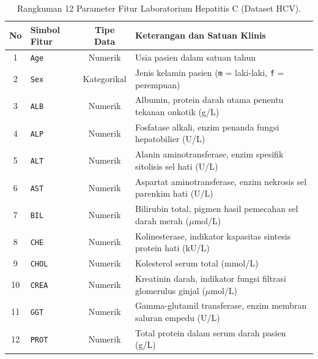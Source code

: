 \documentclass[a4paper,oneside,12pt]{report}
\begin{document}
\begin{table}[H]
\centering
\caption{Rangkuman 12 Parameter Fitur Laboratorium Hepatitis C (Dataset HCV).}
\label{tab:fitur-hcv}
\small
\begin{tabularx}{\linewidth}{|c|l|c|>{\raggedright\arraybackslash}X|}
\hline
\textbf{No} & \textbf{Simbol Fitur} & \textbf{Tipe Data} & \textbf{Keterangan dan Satuan Klinis} \\
\hline
1 & \texttt{Age} & Numerik & Usia pasien dalam satuan tahun \\
\hline
2 & \texttt{Sex} & Kategorikal & Jenis kelamin pasien (\texttt{m} = laki-laki, \texttt{f} = perempuan) \\
\hline
3 & \texttt{ALB} & Numerik & Albumin, protein darah utama penentu tekanan onkotik (g/L) \\
\hline
4 & \texttt{ALP} & Numerik & Fosfatase alkali, enzim penanda fungsi hepatobilier (U/L) \\
\hline
5 & \texttt{ALT} & Numerik & Alanin aminotransferase, enzim spesifik sitolisis sel hati (U/L) \\
\hline
6 & \texttt{AST} & Numerik & Aspartat aminotransferase, enzim nekrosis sel parenkim hati (U/L) \\
\hline
7 & \texttt{BIL} & Numerik & Bilirubin total, pigmen hasil pemecahan sel darah merah ($\mu$mol/L) \\
\hline
8 & \texttt{CHE} & Numerik & Kolinesterase, indikator kapasitas sintesis protein hati (kU/L) \\
\hline
9 & \texttt{CHOL} & Numerik & Kolesterol serum total (mmol/L) \\
\hline
10 & \texttt{CREA} & Numerik & Kreatinin darah, indikator fungsi filtrasi glomerulus ginjal ($\mu$mol/L) \\
\hline
11 & \texttt{GGT} & Numerik & Gamma-glutamil transferase, enzim membran saluran empedu (U/L) \\
\hline
12 & \texttt{PROT} & Numerik & Total protein dalam serum darah pasien (g/L) \\
\hline
\end{tabularx}
\end{table}
\end{document}
